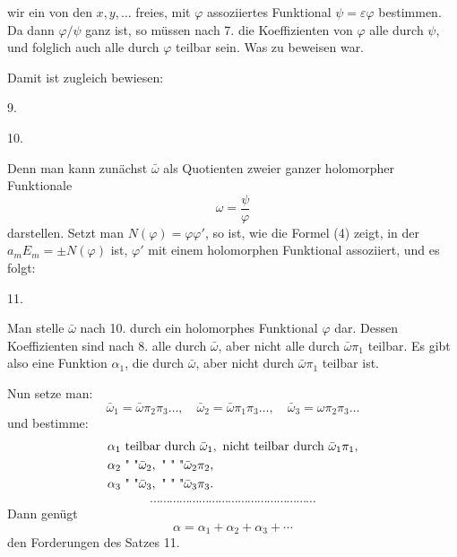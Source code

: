 wir ein von den $x, y, \ldots$ freies, mit $\varphi$ assoziiertes Funktional
$\psi = \varepsilon\varphi$ bestimmen. Da dann $\varphi/\psi$ ganz ist, so müssen nach 7.
die Koeffizienten von $\varphi$ alle durch $\psi$, und folglich auch alle
durch $\varphi$ teilbar sein. Was zu beweisen war.

Damit ist zugleich bewiesen:

9. 

10. 

Denn man kann zunächst $\bar\omega$ als Quotienten zweier ganzer
holomorpher Funktionale
\[
\omega = \frac{\psi}{\varphi}
\]
darstellen. Setzt man $N(\varphi) = \varphi\varphi'$, so ist, wie die Formel (4)
zeigt, in der $a_m E_m = \pm N(\varphi)$ ist, $\varphi'$ mit einem holomorphen
Funktional assoziiert, und es folgt:

11. 

Man stelle $\bar\omega$ nach 10. durch ein holomorphes Funktional $\varphi$
dar. Dessen Koeffizienten sind nach 8. alle durch $\bar\omega$, aber nicht
alle durch $\bar\omega \pi_1$ teilbar. Es gibt also eine Funktion $\alpha_1$, die durch
$\bar\omega$, aber nicht durch $\bar\omega \pi_1$ teilbar ist.

Nun setze man:
\[
\bar\omega_1 = \bar\omega \pi_2 \pi_3 \ldots, \quad \bar\omega_2 = \bar\omega \pi_1 \pi_3 \ldots, \quad \bar\omega_3 = \omega \pi_2 \pi_3 \ldots
\]
und bestimme:
\[
\begin{aligned}
&\alpha_1 \text{ teilbar durch } \bar\omega_1, \text{ nicht teilbar durch } \bar\omega_1 \pi_1, \\
&\alpha_2 \text{ \textquotedbl} \text{ \textquotedbl} \bar\omega_2, \text{ \textquotedbl} \text{ \textquotedbl} \text{ \textquotedbl} \bar\omega_2 \pi_2, \\
&\alpha_3 \text{ \textquotedbl} \text{ \textquotedbl} \bar\omega_3, \text{ \textquotedbl} \text{ \textquotedbl} \text{ \textquotedbl} \bar\omega_3 \pi_3.
\end{aligned}
\]
\[
\cdots\cdots\cdots\cdots\cdots\cdots\cdots\cdots\cdots\cdots\cdots\cdots\cdots\cdots\cdots\cdots\cdots
\]
Dann genügt
\[
\alpha = \alpha_1 + \alpha_2 + \alpha_3 + \cdots
\]
den Forderungen des Satzes 11.
